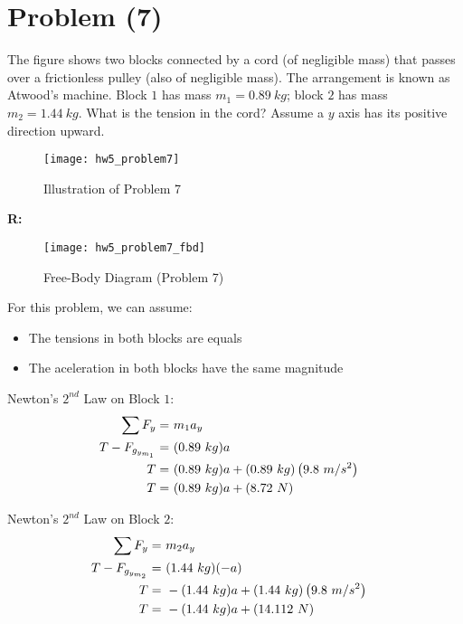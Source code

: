 \section{Problem (7)}
	The figure shows two blocks connected by a cord (of negligible mass) that passes over a frictionless pulley (also of negligible mass). The arrangement is known as Atwood's machine. Block $1$ has mass $m_{1} = 0.89 \ kg$; block $2$ has mass $m_{2} = 1.44 \ kg$. What is the tension in the cord? Assume a $y$ axis has its positive direction upward.

	\begin{figure}[H]
		\begin{center}
			\texttt{[image: hw5\_problem7]}
			\caption{Illustration of Problem 7}
			\label{fig:hw5_problem7}
		\end{center}
	\end{figure}

	\textbf{R:} \newline

	\begin{figure}[H]
		\begin{center}
			\texttt{[image: hw5\_problem7\_fbd]}
			\caption{Free-Body Diagram (Problem 7)}
			\label{fig:hw5_problem7_fbd}
		\end{center}
	\end{figure}

	For this problem, we can assume:
	\begin{itemize}
		\item{The tensions in both blocks are equals}
		\item{The aceleration in both blocks have the same magnitude}
	\end{itemize}

	Newton's $2^{nd}$ Law on Block $1$:
	\begin{align}
		\sum F_{y} = \ &m_{1}a_{y}& \notag \\
		T - F_{g_{y_{m_{1}}}} = \ &(0.89 \ kg)a& \notag \\
		T = \ &(0.89 \ kg)a + (0.89 \ kg)\left(9.8 \ m/s^{2}\right)& \notag \\
		T = \ &(0.89 \ kg)a + (8.72 \ N)& \notag
	\end{align}

	Newton's $2^{nd}$ Law on Block $2$:
	\begin{align}
		\sum F_{y} = \ &m_{2}a_{y}& \notag \\
		T - F_{g_{y_{m_{2}}}} = \ &(1.44 \ kg)(-a)& \notag \\
		T = \ &-(1.44 \ kg)a + (1.44 \ kg)\left(9.8 \ m/s^{2}\right)& \notag \\
		T = \ &-(1.44 \ kg)a + (14.112 \ N)& \notag
	\end{align}

